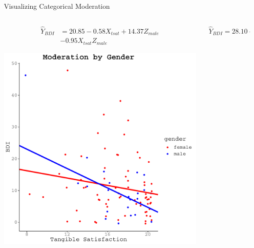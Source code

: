 \documentclass{beamer}\usepackage[]{graphicx}\usepackage[]{color}
\makeatletter
\def\maxwidth{ %
  \ifdim\Gin@nat@width>\linewidth
    \linewidth
  \else
    \Gin@nat@width
  \fi
}
\newenvironment{knitrout}{}{} %
\makeatother
\begin{document}

\begin{frame}[fragile]{Visualizing Categorical Moderation}

  \begin{columns}
    \begin{column}{0.5\textwidth}
      {\scriptsize
        \begin{align*}
          \hat{Y}_{BDI} &= 20.85 
            -0.58 X_{tsat} + 
              14.37 Z_{male}\\ 
                &-0.95 
                  X_{tsat} Z_{male}
        \end{align*}
      }
\begin{knitrout}\footnotesize
{}\color{fgcolor}

{\centering \includegraphics[width=\maxwidth]{figure/unnamed-chunk-24-1} 

}



\end{knitrout}

\end{column}

\begin{column}{0.5\textwidth}
  {\scriptsize
    \begin{align*}
      \hat{Y}_{BDI} = 28.10  
      -1.00 X_{tsat}  
      -1.05 Z_{male}
    \end{align*}
  }
\begin{knitrout}\footnotesize
{}\color{fgcolor}


\end{knitrout}
\end{column}
\end{columns}
\end{frame}
\end{document}
